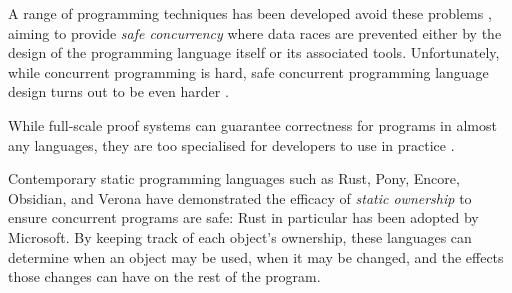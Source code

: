 A range of programming techniques has been developed avoid these problems
\cite{lea98,concurrentHard}, aiming to provide \textit{safe
  concurrency} where data races are prevented either by the design  of the
programming language itself or its associated tools.  Unfortunately, while 
concurrent programming is hard, safe concurrent programming language
design turns out to be even harder \cite{RustBook,EncoreTS}. 
%


While full-scale proof systems \cite{JacobsEA05,chalice,jonesTOPLAS83,MPC-Staden15,concur2007,DenyGuarantee,dd}
can guarantee correctness for programs in almost any languages,
they are too specialised for developers to use in practice
\cite{fonesca2017,shriramFormal2019}.

Contemporary static programming languages such as
Rust\cite{RustBook}, Pony\cite{PonyTS},
Encore\cite{EncoreTS},
Obsidian\cite{aldrichObsidianStudy2020}, and
Verona \cite{Verona} 
have demonstrated the efficacy of \textit{static
  ownership}\cite{ClaPotNobOOPSLA98,NobPotVitECOOP98} %
to ensure
concurrent programs are safe: Rust in particular has been adopted by
Microsoft\cite{RustPopular,MSRust}. By keeping track of each object's
ownership, these languages can determine when an object may be used,
when it may be changed, and the effects those changes can have on the
rest of the program.
%
%
%
%
